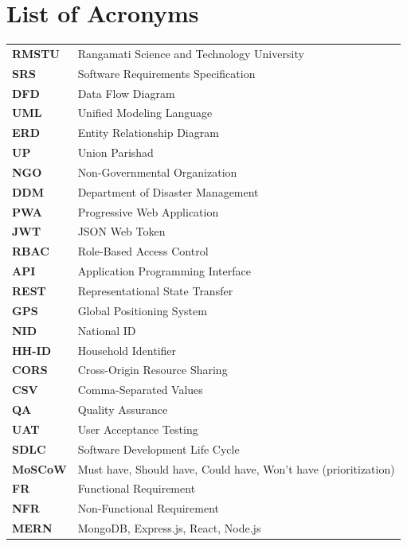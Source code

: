 \chapter*{List of Acronyms}

\begin{tabularx}{\textwidth}{@{}lX@{}}
\textbf{RMSTU} & Rangamati Science and Technology University \\
\textbf{SRS} & Software Requirements Specification \\
\textbf{DFD} & Data Flow Diagram \\
\textbf{UML} & Unified Modeling Language \\
\textbf{ERD} & Entity Relationship Diagram \\
\textbf{UP} & Union Parishad \\
\textbf{NGO} & Non-Governmental Organization \\
\textbf{DDM} & Department of Disaster Management \\
\textbf{PWA} & Progressive Web Application \\
\textbf{JWT} & JSON Web Token \\
\textbf{RBAC} & Role-Based Access Control \\
\textbf{API} & Application Programming Interface \\
\textbf{REST} & Representational State Transfer \\
\textbf{GPS} & Global Positioning System \\
\textbf{NID} & National ID \\
\textbf{HH-ID} & Household Identifier \\
\textbf{CORS} & Cross-Origin Resource Sharing \\
\textbf{CSV} & Comma-Separated Values \\
\textbf{QA} & Quality Assurance \\
\textbf{UAT} & User Acceptance Testing \\
\textbf{SDLC} & Software Development Life Cycle \\
\textbf{MoSCoW} & Must have, Should have, Could have, Won't have (prioritization) \\
\textbf{FR} & Functional Requirement \\
\textbf{NFR} & Non-Functional Requirement \\
\textbf{MERN} & MongoDB, Express.js, React, Node.js \\
\end{tabularx}
